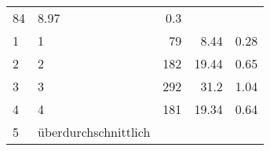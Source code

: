 \begin{longtable}{lXrrr}
       \num{84} &
       \num[round-mode=places,round-precision=2]{8.97} &
         \num[round-mode=places,round-precision=2]{0.3} \\

     1 &
     \multicolumn{1}{X}{ 1   } &


       \num{79} &
       \num[round-mode=places,round-precision=2]{8.44} &
         \num[round-mode=places,round-precision=2]{0.28} \\

     2 &
     \multicolumn{1}{X}{ 2   } &


       \num{182} &
       \num[round-mode=places,round-precision=2]{19.44} &
         \num[round-mode=places,round-precision=2]{0.65} \\

     3 &
     \multicolumn{1}{X}{ 3   } &


       \num{292} &
       \num[round-mode=places,round-precision=2]{31.2} &
         \num[round-mode=places,round-precision=2]{1.04} \\

     4 &
     \multicolumn{1}{X}{ 4   } &


       \num{181} &
       \num[round-mode=places,round-precision=2]{19.34} &
         \num[round-mode=places,round-precision=2]{0.64} \\

     5 &
     \multicolumn{1}{X}{ überdurchschnittlich   } &



\end{longtable}
